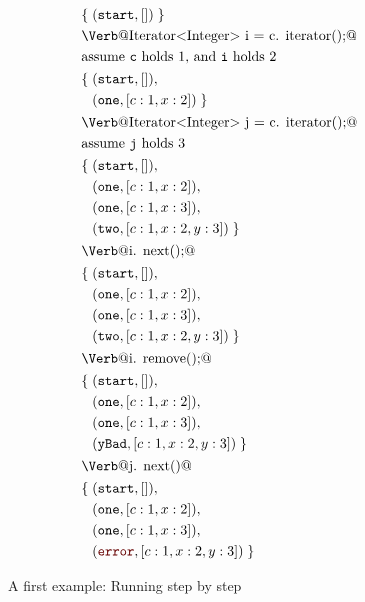 \documentclass[preprint]{sigplanconf} %
\newcommand{\error}{\ensuremath{\textcolor{darkred}{\mathtt{error}}}\xspace}
\newcommand{\start}{\ensuremath{\mathtt{start}}\xspace}
\theoremstyle{definition}
\theoremstyle{remark}
\begin{document}
\begin{figure}
{\def\s#1{\text{\Verb@#1@}}
 \def\m#1{\PY{n+na}{#1}}
 \def\t#1{\mathtt{#1}}
\begin{align*}
&\{\;(\start,[])\;\} \\
&\s{Iterator<Integer> i = c.\m{iterator}();} \\
&\text{assume {\tt c} holds $1$, and {\tt i} holds $2$ } \\
& \begin{aligned}
  \{\;&(\start,[]),\\
      &(\t{one},[c:1,x:2])\;\}
  \end{aligned}\\
&\s{Iterator<Integer> j = c.\m{iterator}();} \\
&\text{assume {\tt j} holds $3$} \\
& \begin{aligned}
  \{\;&(\start,[]),\\
      &(\t{one},[c:1,x:2]),\\
      &(\t{one},[c:1,x:3]),\\
      &(\t{two},[c:1,x:2,y:3])\;\}
  \end{aligned}\\
&\s{i.\m{next}();} \\
& \begin{aligned}
  \{\;&(\start,[]),\\
      &(\t{one},[c:1,x:2]),\\
      &(\t{one},[c:1,x:3]),\\
      &(\t{two},[c:1,x:2,y:3])\;\}
  \end{aligned}\\
&\s{i.\m{remove}();} \\
& \begin{aligned}
  \{\;&(\start,[]),\\
      &(\t{one},[c:1,x:2]),\\
      &(\t{one},[c:1,x:3]),\\
      &(\t{yBad},[c:1,x:2,y:3])\;\}
  \end{aligned}\\
&\s{j.\m{next}()} \\
& \begin{aligned}
  \{\;&(\start,[]),\\
      &(\t{one},[c:1,x:2]),\\
      &(\t{one},[c:1,x:3]),\\
      &(\error,[c:1,x:2,y:3])\;\}
  \end{aligned}\\
\end{align*}}
\caption{A first example: Running step by step}
\label{fig:first.steps}
\end{figure} %
\end{document}
